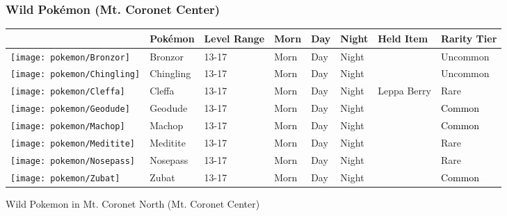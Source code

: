 \subsubsection{Wild Pokémon (Mt. Coronet Center)}%
\label{ssubsec:WildPokmon(Mt.CoronetCenter)}%
\begin{longtable}{||l l l l l l l l||}%
\hline%
\rowcolor{gray}%
&Pokémon&Level Range&Morn&Day&Night&Held Item&Rarity Tier\\%
\hline%
\endhead%
\hline%
\rowcolor{gray}%
\texttt{[image: pokemon/Bronzor]}&Bronzor&13{-}17&Morn&Day&Night&&\textcolor{OliveGreen}{%
Uncommon%
}\\%
\hline%
\rowcolor{gray}%
\texttt{[image: pokemon/Chingling]}&Chingling&13{-}17&Morn&Day&Night&&\textcolor{OliveGreen}{%
Uncommon%
}\\%
\hline%
\rowcolor{gray}%
\texttt{[image: pokemon/Cleffa]}&Cleffa&13{-}17&Morn&Day&Night&Leppa Berry&\textcolor{RedOrange}{%
Rare%
}\\%
\hline%
\rowcolor{gray}%
\texttt{[image: pokemon/Geodude]}&Geodude&13{-}17&Morn&Day&Night&&\textcolor{black}{%
Common%
}\\%
\hline%
\rowcolor{gray}%
\texttt{[image: pokemon/Machop]}&Machop&13{-}17&Morn&Day&Night&&\textcolor{black}{%
Common%
}\\%
\hline%
\rowcolor{gray}%
\texttt{[image: pokemon/Meditite]}&Meditite&13{-}17&Morn&Day&Night&&\textcolor{RedOrange}{%
Rare%
}\\%
\hline%
\rowcolor{gray}%
\texttt{[image: pokemon/Nosepass]}&Nosepass&13{-}17&Morn&Day&Night&&\textcolor{RedOrange}{%
Rare%
}\\%
\hline%
\rowcolor{gray}%
\texttt{[image: pokemon/Zubat]}&Zubat&13{-}17&Morn&Day&Night&&\textcolor{black}{%
Common%
}\\%
\hline%
\end{longtable}%
\caption{Wild Pokemon in Mt. Coronet North (Mt. Coronet Center)}